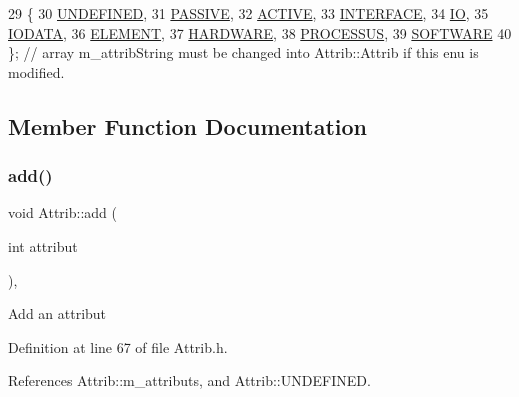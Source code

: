 \begin{DoxyCode}
29                 \{
30     \hyperlink{classAttrib_a69e171d7cc6417835a5a306d3c764235a3a8da2ab97dda18aebab196fe4100531}{UNDEFINED},
31     \hyperlink{classAttrib_a69e171d7cc6417835a5a306d3c764235a2bfb2af57b87031d190a05fe25dd92ed}{PASSIVE},
32     \hyperlink{classAttrib_a69e171d7cc6417835a5a306d3c764235a3b1fec929c0370d1436f2f06e298fb0d}{ACTIVE},
33     \hyperlink{classAttrib_a69e171d7cc6417835a5a306d3c764235aa27c16b480a369ea4d18b07b2516bbc7}{INTERFACE},
34     \hyperlink{classAttrib_a69e171d7cc6417835a5a306d3c764235a1420a5b8c0540b2af210b6975eded7f9}{IO},
35     \hyperlink{classAttrib_a69e171d7cc6417835a5a306d3c764235a0af3b0d0ac323c1704e6c69cf90add28}{IODATA},
36     \hyperlink{classAttrib_a69e171d7cc6417835a5a306d3c764235a7788bc5dd333fd8ce18562b269c9dab1}{ELEMENT},
37     \hyperlink{classAttrib_a69e171d7cc6417835a5a306d3c764235a61ceb22149f365f1780d18f9d1459423}{HARDWARE},
38     \hyperlink{classAttrib_a69e171d7cc6417835a5a306d3c764235a75250e29692496e73effca2c0330977f}{PROCESSUS},
39     \hyperlink{classAttrib_a69e171d7cc6417835a5a306d3c764235a103a67cd0b8f07ef478fa45d4356e27b}{SOFTWARE} 
40   \}; \textcolor{comment}{// array m\_attribString must be changed into Attrib::Attrib if this enu is modified. }
\end{DoxyCode}


\subsection{Member Function Documentation}
\mbox{\label{classAttrib_a235f773af19c900264a190b00a3b4ad7}} 
\subsubsection{\texorpdfstring{add()}{add()}}
{\footnotesize\ttfamily void Attrib\+::add (\begin{DoxyParamCaption}\item[{int}]{attribut }\end{DoxyParamCaption})\hspace{0.3cm}{\ttfamily [inline]}, {\ttfamily [inherited]}}

Add an attribut 

Definition at line 67 of file Attrib.\+h.



References Attrib\+::m\+\_\+attributs, and Attrib\+::\+U\+N\+D\+E\+F\+I\+N\+ED.



